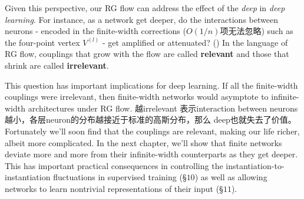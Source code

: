 Given this perspective, our RG flow can address the effect of 
the \emph{deep} in \emph{deep learning}. For instance, as a network get 
deeper, do the interactions between neurons - encoded in the finite-width 
corrections ($O(1/n)$项无法忽略) such as the four-point vertex $V^{(l)}$ - 
get amplified or attenuated? ()  
In the language of RG flow, couplings that grow with the flow are called 
\textbf{relevant} and those that shrink are called \textbf{irrelevant}. 

This question has important implications for deep learning. If all the 
finite-width couplings were irrelevant, then finite-width networks 
would asymptote to infinite-width architectures under RG flow. 越irrelevant 
表示interaction between neurons越小，各层neuron的分布越接近于标准的高斯分布，那么
deep也就失去了价值。Fortunately we'll soon find that the couplings are relevant, 
making our life richer, albeit more complicated. In the next chapter, we'll
show that finite networks deviate more and more from their infinite-width 
counterparts as they get deeper. This has important practical consequences 
in controlling the instantiation-to-instantiation fluctuations in supervised 
training (§$10$) as well as allowing networks to learn nontrivial representations 
of their input (§$11$). 


